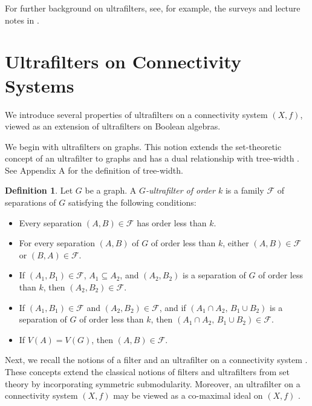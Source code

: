 \documentclass[10pt]{book}
\theoremstyle{definition}
\newtheorem{definition}[theorem]{Definition}
\begin{document}
For further background on ultrafilters, see, for example, the surveys and lecture notes in \cite{80,82}.

\section{Ultrafilters on Connectivity Systems}
We introduce several properties of ultrafilters on a connectivity system \((X,f)\), viewed as an extension of ultrafilters on Boolean algebras.

We begin with ultrafilters on graphs. This notion extends the set-theoretic concept of an ultrafilter to graphs and has a dual relationship with tree-width \cite{fujitaultrafilter}.  
See Appendix A for the definition of tree-width.

\begin{definition}\cite{fujitaultrafilter}
Let \(G\) be a graph. A \emph{\(G\)-ultrafilter of order \(k\)} is a family \(\mathcal{F}\) of separations of \(G\) satisfying the following conditions:
\begin{itemize}
    \item[(FG0)] Every separation \((A,B)\in\mathcal{F}\) has order less than \(k\).
    \item[(FG1)] For every separation \((A,B)\) of \(G\) of order less than \(k\), either \((A,B)\in\mathcal{F}\) or \((B,A)\in\mathcal{F}\).
    \item[(FG2)] If \((A_1,B_1)\in\mathcal{F}\), \(A_1\subseteq A_2\), and \((A_2,B_2)\) is a separation of \(G\) of order less than \(k\), then \((A_2,B_2)\in\mathcal{F}\).
    \item[(FG3)] If \((A_1,B_1)\in\mathcal{F}\) and \((A_2,B_2)\in\mathcal{F}\), and if \((A_1\cap A_2,\, B_1\cup B_2)\) is a separation of \(G\) of order less than \(k\), then \((A_1\cap A_2,\, B_1\cup B_2)\in\mathcal{F}\).
    \item[(FG4)] If \(V(A)=V(G)\), then \((A,B)\in\mathcal{F}\).
\end{itemize}
\end{definition}

Next, we recall the notions of a filter and an ultrafilter on a connectivity system \cite{16}.  
These concepts extend the classical notions of filters and ultrafilters from set theory by incorporating symmetric submodularity.  
Moreover, an ultrafilter on a connectivity system \((X,f)\) may be viewed as a co-maximal ideal on \((X,f)\) \cite{49}.
\end{document}
